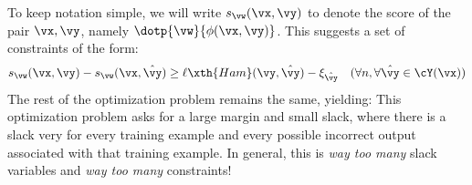 To keep notation simple, we will write $s_\vw(\vx,\vy)$ to denote the score of the pair $\vx,\vy$, namely $\dotp{\vw}{\phi(\vx,\vy)}$.
This suggests a set of constraints of the form:
\begin{align} &
  s_\vw(\vx,\vy) - s_\vw(\vx,\hat\vy)
  \geq
  \ell\xth{Ham}(\vy, \hat\vy)
  - \xi_{\hat\vy}
 & (\forall n, \forall \hat\vy \in \cY(\vx))
\end{align}
The rest of the optimization problem remains the same, yielding:
%
%
This optimization problem asks for a large margin and small slack, where there is a slack very for every training example and every possible incorrect output associated with that training example.
In general, this is \emph{way too many} slack variables and \emph{way too many} constraints!

